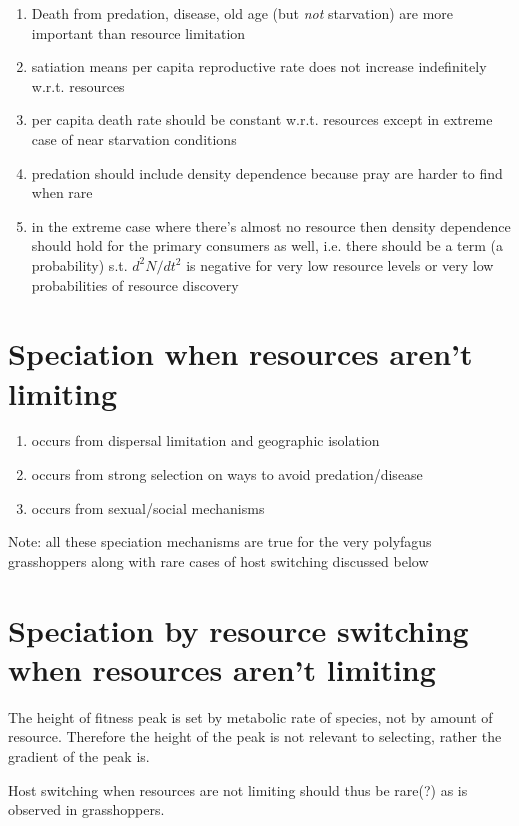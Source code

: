 \documentclass[12pt]{article}
\begin{document}
\begin{enumerate}
\item Death from predation, disease, old age (but \emph{not}
  starvation) are more important than resource limitation
\item satiation means per capita reproductive rate does not increase
  indefinitely w.r.t. resources
\item per capita death rate should be constant w.r.t. resources except
  in extreme case of near starvation conditions
\item predation should include density dependence because pray are
  harder to find when rare
\item in the extreme case where there's almost no resource then
  density dependence should hold for the primary consumers as well,
  i.e. there should be a term (a probability) s.t. $d^2N/dt^2$ is
  negative for very low resource levels or very low probabilities of
  resource discovery
\end{enumerate}

\section{Speciation when resources aren't limiting}

\begin{enumerate}
\item occurs from dispersal limitation and geographic isolation
\item occurs from strong selection on ways to avoid predation/disease
\item occurs from sexual/social mechanisms
\end{enumerate}

Note: all these speciation mechanisms are true for the very polyfagus
grasshoppers along with rare cases of host switching discussed below

\section{Speciation by resource switching when resources aren't
  limiting}

The height of fitness peak is set by metabolic rate of species, not by
amount of resource. Therefore the height of the peak is not relevant to
selecting, rather the gradient of the peak is.

Host switching when resources are not limiting should thus be rare(?)
as is observed in grasshoppers.
\end{document}
